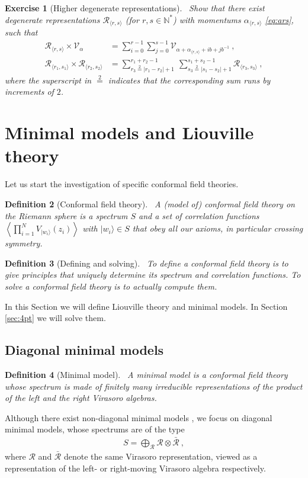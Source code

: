 \documentclass[12pt, a4paper]{article}
\theoremstyle{break}
\newtheorem{exo}{Exercise}[section]
\newtheorem{defn}[exo]{Definition}
\begin{document}
\begin{exo}[Higher degenerate representations]
~\label{exo:hdr}
 Show that there exist degenerate representations $\mathcal{R}_{\langle r,s \rangle}$ (for $r, s \in \mathbb{N}^*$) with momentums $\alpha_{\langle r,s \rangle}$ \eqref{eq:ars},
such that 
 \begin{align}
 \mathcal{R}_{\langle r,s \rangle}\times \mathcal{V}_\alpha &= \sum_{i=0}^{r-1} \sum_{j=0}^{s-1} \mathcal{V}_{\alpha + \alpha_{\langle r,s \rangle}+ ib+jb^{-1}}\ ,
\label{rtv}
 \\
 \mathcal{R}_{\langle r_1,s_1 \rangle} \times \mathcal{R}_{\langle r_2,s_2 \rangle} &= \sum_{r_3\overset{2}{=}|r_1-r_2|+1}^{r_1+r_2-1}\ \sum_{s_3\overset{2}{=}|s_1-s_2|+1}^{s_1+s_2-1} \mathcal{R}_{\langle r_3,s_3 \rangle}\ ,
\label{rrsr}
\end{align}
where the superscript in $\overset{2}{=}$ indicates that the corresponding sum runs by increments of $2$. 
\end{exo}


\section{Minimal models and Liouville theory}

Let us start the investigation of specific conformal field theories. 

\begin{defn}[Conformal field theory]
~\label{def:cft}
A (model of) conformal field theory on the Riemann sphere is a spectrum $S$ and a set of correlation functions $\left<\prod_{i=1}^N V_{|w_i\rangle}(z_i)\right>$ with $|w_i\rangle\in S$ that obey all our axioms, in particular crossing symmetry. 
\end{defn}

\begin{defn}[Defining and solving]
 ~\label{def:def}
 To define a conformal field theory is to give principles that uniquely determine its spectrum and correlation functions.
 To solve a conformal field theory is to actually compute them.
\end{defn}
In this Section we will define Liouville theory and minimal models. In Section \ref{sec:4pt} we will solve them.


\subsection{Diagonal minimal models}

\begin{defn}[Minimal model]
 ~\label{def:mm}
 A minimal model is a conformal field theory whose spectrum is made of finitely many irreducible representations of the product of the left and the right Virasoro algebras.
\end{defn}
Although there exist non-diagonal minimal models \cite{fms97}, we focus on diagonal minimal models, whose spectrums are of the type
\begin{align}
 S = \bigoplus_\mathcal{R} \mathcal{R}\otimes  \mathcal{\bar R}\ ,
\end{align}
where $\mathcal{R}$ and $ \mathcal{\bar R}$ denote the same Virasoro representation, viewed as a representation of the left- or right-moving Virasoro algebra respectively.
\end{document}
